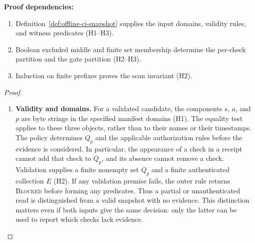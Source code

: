 \noindent\textbf{Proof dependencies:}
\begin{enumerate}
\item Definition~\ref{def:offline-ci-snapshot} supplies the input
domains, validity rules, and witness predicates (H1--H3).
\item Boolean excluded middle and finite set membership determine
the per-check partition and the gate partition (H2--H3).
\item Induction on finite prefixes proves the scan invariant (H2).
\end{enumerate}

\begin{proof}
\begin{enumerate}
\item \textbf{Validity and domains.}
For a validated candidate, the components $s$, $a$, and $p$
are byte strings in the specified manifest domains (H1).
The equality test applies to these three objects,
rather than to their names or their timestamps.
The policy determines $Q_p$ and the applicable authorization rules
before the evidence is considered.
In particular, the appearance of a check in a receipt cannot
add that check to $Q_p$, and its absence cannot remove a check.
Validation supplies a finite nonempty set $Q_p$
and a finite authenticated collection $E$ (H2).
If any validation premise fails, the outer rule returns
\textsc{Blocked} before forming any predicates.
Thus a partial or unauthenticated read is distinguished from
a valid snapshot with no evidence.
This distinction matters even if both inputs give the same decision:
only the latter can be used to report which checks lack evidence.


\end{enumerate}
\end{proof}
